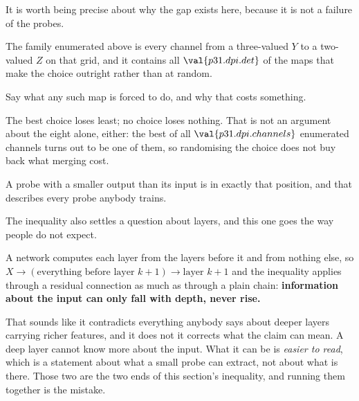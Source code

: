 \begin{fr}
It is worth being precise about why the gap exists here, because it is not a
failure of the probes.

The family enumerated above is every channel from a three-valued $Y$ to a
two-valued $Z$ on that grid, and it contains all $\val{p31.dpi.det}$ of the
maps that make the choice outright rather than at random.

Say what any such map is forced to do, and why that costs something.
\dotline
\nextframe
\end{fr}

\begin{fr}

The best choice loses least; no choice loses nothing. That is not an
argument about the eight alone, either: the best of all
$\val{p31.dpi.channels}$ enumerated channels turns out to be one of them, so
randomising the choice does not buy back what merging cost.

A probe with a smaller output than its input is in exactly that position, and
that describes every probe anybody trains.
\end{fr}

\begin{fr}
\begin{aibox}
The inequality also settles a question about layers, and this one goes the
way people do not expect.

A network computes each layer from the layers before it and from nothing
else, so $X \to (\text{everything before layer } k+1) \to \text{layer } k+1$
and the inequality applies \dash{} through a residual connection as much
as through a plain chain:
\textbf{information about the input can only fall with depth, never rise.}

That sounds like it contradicts everything anybody says about deeper layers
carrying richer features, and it does not \dash{} it corrects what the claim
can mean. A deep layer cannot know more about the input. What it can be is
\emph{easier to read}, which is a statement about what a small probe can
extract, not about what is there. Those two are the two ends of this
section's inequality, and running them together is the mistake.
\end{aibox}

\end{fr}

